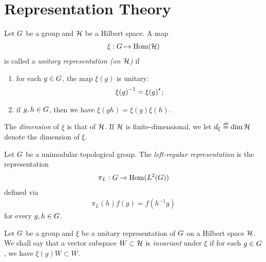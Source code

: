 \section{Representation Theory}

\begin{definition}
\label{definition:unitary_representation}
    Let $G$ be a group and $\mathcal{H}$ be a Hilbert space.
    A map
    \begin{align*}
        \xi : G \mapsto \operatorname{Hom}(\mathcal{H})
    \end{align*}
    is called a \emph{unitary representation (on $\mathcal{H}$)} if
    \begin{enumerate}
        \item for each $g \in G$, the map $\xi(g)$ is unitary:
            \begin{align*}
                {\xi(g)}^{-1} = {\xi(g)}^\star;
            \end{align*}
        \item if $g, h \in G$, then we have $\xi(g h) = \xi(g) \xi(h)$.
    \end{enumerate}

    The \emph{dimension} of $\xi$ is that of $\mathcal{H}$.
    If $\mathcal{H}$ is finite-dimensional,
    we let $\dimRep{\xi} \defeq \dim{\Hil}$ denote the dimension of $\xi$.
\end{definition}

\begin{example}
    Let $G$ be a unimodular topological group.
    The \emph{left-regular representation} is the representation
    \begin{align*}
        \pi_L : G \to \operatorname{Hom}({L^{2} (G)})
    \end{align*}
    defined via
    \begin{align*}
        \pi_L(h) f(g) = f(h^{-1} g)
    \end{align*}
    for every $g, h \in G$.
\end{example}

\begin{definition}
\label{definition:invariant_subspaces}
    Let $G$ be a group and $\xi$ be a unitary representation of $G$ on a Hilbert space $\mathcal{H}$.
    We shall say that a vector subspace $W \subset \mathcal{H}$ is \emph{invariant} under $\xi$
    if for each $g \in G$, we have $\xi(g) W \subset W$.
\end{definition}


